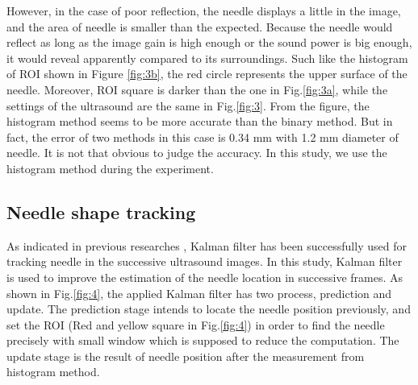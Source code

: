 \documentclass[journal,article,submit,moreauthors,pdftex]{Definitions/mdpi}
\begin{document}
However, in the case of poor reflection, the needle displays a little in the image, and the area of needle is smaller than the expected.
Because the needle would reflect as long as the image gain is high enough or the sound power is big enough, it would reveal apparently compared to its surroundings. Such like the histogram of ROI shown in Figure \ref{fig:3b}, the red circle represents the upper surface of the needle.
Moreover, ROI square is darker than the one in Fig.\ref{fig:3a}, while the settings of the ultrasound are the same in Fig.\ref{fig:3}.
From the figure, the histogram method seems to be more accurate than the binary method.
But in fact, the error of two methods in this case is 0.34 mm with 1.2 mm diameter of needle.
It is not that obvious to judge the accuracy.
In this study, we use the histogram method during the experiment.

\subsection{Needle shape tracking}

As indicated in previous researches \cite{Mignon2018,Mignon2016,Yue2012}, Kalman filter has been successfully used for tracking needle in the successive ultrasound images.
In this study, Kalman filter is used to improve the estimation of the needle location in successive frames.
As shown in Fig.\ref{fig:4}, the applied Kalman filter has two process, prediction and update.
The prediction stage intends to locate the needle position previously, and set the ROI (Red and yellow square in Fig.\ref{fig:4}) in order to find the needle precisely with small window which is supposed to reduce the computation.
The update stage is the result of needle position after the measurement from histogram method.
\end{document}
